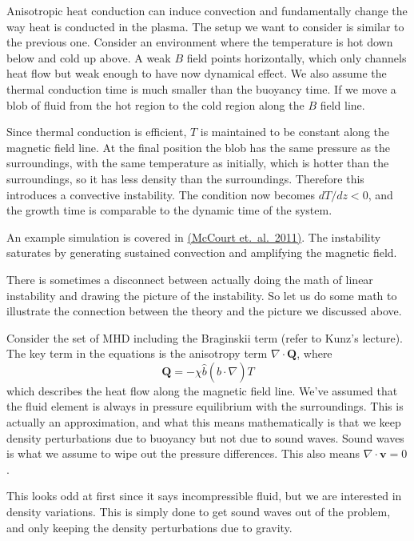 \documentclass[letterpaper, 11pt]{article}
\numberwithin{equation}{section}
\numberwithin{figure}{section}
\begin{document}
Anisotropic heat conduction can induce convection and fundamentally change the
way heat is conducted in the plasma. The setup we want to consider is similar to
the previous one. Consider an environment where the temperature is hot down
below and cold up above. A weak $B$ field points horizontally, which only
channels heat flow but weak enough to have now dynamical effect. We also assume
the thermal conduction time is much smaller than the buoyancy time. If we move a
blob of fluid from the hot region to the cold region along the $B$ field line.

Since thermal conduction is efficient, $T$ is maintained to be constant along
the magnetic field line. At the final position the blob has the same pressure as
the surroundings, with the same temperature as initially, which is hotter than
the surroundings, so it has less density than the surroundings. Therefore this
introduces a convective instability. The condition now becomes $dT/dz < 0$, and
the growth time is comparable to the dynamic time of the system.

An example simulation is covered in
\href{http://adsabs.harvard.edu/abs/2011MNRAS.413.1295M}{(McCourt et.\ al.\
  2011)}. The instability saturates by generating sustained convection and
amplifying the magnetic field.

There is sometimes a disconnect between actually doing the math of linear
instability and drawing the picture of the instability. So let us do some math
to illustrate the connection between the theory and the picture we discussed
above.

Consider the set of MHD including the Braginskii term (refer to Kunz's lecture).
The key term in the equations is the anisotropy term $\nabla\cdot \mathbf{Q}$,
where
\begin{equation}
  \label{eq:29}
  \mathbf{Q} = -\chi \hat{b} (\hat{b}\cdot\nabla)T
\end{equation}
which describes the heat flow along the magnetic field line. We've assumed that
the fluid element is always in pressure equilibrium with the surroundings. This
is actually an approximation, and what this means mathematically is that we keep
density perturbations due to buoyancy but not due to sound waves. Sound waves is
what we assume to wipe out the pressure differences. This also means
$\nabla\cdot \mathbf{v} = 0$.

This looks odd at first since it says incompressible fluid, but we are
interested in density variations. This is simply done to get sound waves out of
the problem, and only keeping the density perturbations due to gravity.
\end{document}
